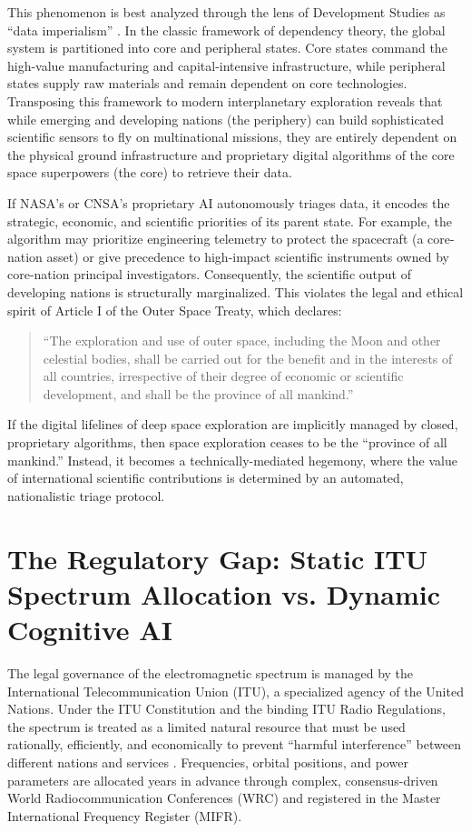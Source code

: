 \documentclass[final,5p,times,twocolumn]{elsarticle}
\begin{document}
This phenomenon is best analyzed through the lens of Development Studies as ``data imperialism'' \citep{escobar2018digital}. In the classic framework of dependency theory, the global system is partitioned into core and peripheral states. Core states command the high-value manufacturing and capital-intensive infrastructure, while peripheral states supply raw materials and remain dependent on core technologies. Transposing this framework to modern interplanetary exploration reveals that while emerging and developing nations (the periphery) can build sophisticated scientific sensors to fly on multinational missions, they are entirely dependent on the physical ground infrastructure and proprietary digital algorithms of the core space superpowers (the core) to retrieve their data.

If NASA's or CNSA's proprietary AI autonomously triages data, it encodes the strategic, economic, and scientific priorities of its parent state. For example, the algorithm may prioritize engineering telemetry to protect the spacecraft (a core-nation asset) or give precedence to high-impact scientific instruments owned by core-nation principal investigators. Consequently, the scientific output of developing nations is structurally marginalized. This violates the legal and ethical spirit of Article I of the Outer Space Treaty, which declares:
\begin{quote}
``The exploration and use of outer space, including the Moon and other celestial bodies, shall be carried out for the benefit and in the interests of all countries, irrespective of their degree of economic or scientific development, and shall be the province of all mankind.'' \citep{ost1967}
\end{quote}
If the digital lifelines of deep space exploration are implicitly managed by closed, proprietary algorithms, then space exploration ceases to be the ``province of all mankind.'' Instead, it becomes a technically-mediated hegemony, where the value of international scientific contributions is determined by an automated, nationalistic triage protocol.

\section{The Regulatory Gap: Static ITU Spectrum Allocation vs. Dynamic Cognitive AI}
\label{sec:legal}

The legal governance of the electromagnetic spectrum is managed by the International Telecommunication Union (ITU), a specialized agency of the United Nations. Under the ITU Constitution and the binding ITU Radio Regulations, the spectrum is treated as a limited natural resource that must be used rationally, efficiently, and economically to prevent ``harmful interference'' between different nations and services \citep{jakhu2021legal}. Frequencies, orbital positions, and power parameters are allocated years in advance through complex, consensus-driven World Radiocommunication Conferences (WRC) and registered in the Master International Frequency Register (MIFR).
\end{document}
